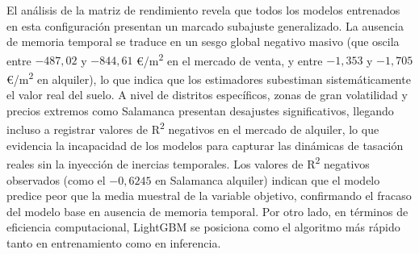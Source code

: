 \documentclass[a4paper,11pt,openany]{book}
\begin{document}
\begin{table}[H]
\centering
\caption{Matriz de rendimiento comparativa del Escenario Inicial (Modelo Base sin retardo temporal) - Mercado de Alquiler (€/m\textsuperscript{2})}
\label{tab:base_model_metrics_alquiler}
\end{table}

El análisis de la matriz de rendimiento revela que todos los modelos entrenados en esta configuración presentan un marcado subajuste generalizado. La ausencia de memoria temporal se traduce en un sesgo global negativo masivo (que oscila entre $-487,02$ y $-844,61$ €/m\textsuperscript{2} en el mercado de venta, y entre $-1,353$ y $-1,705$ €/m\textsuperscript{2} en alquiler), lo que indica que los estimadores subestiman sistemáticamente el valor real del suelo. A nivel de distritos específicos, zonas de gran volatilidad y precios extremos como Salamanca presentan desajustes significativos, llegando incluso a registrar valores de R\textsuperscript{2} negativos en el mercado de alquiler, lo que evidencia la incapacidad de los modelos para capturar las dinámicas de tasación reales sin la inyección de inercias temporales. Los valores de R\textsuperscript{2} negativos observados (como el $-0{,}6245$ en Salamanca alquiler) indican que el modelo predice peor que la media muestral de la variable objetivo, confirmando el fracaso del modelo base en ausencia de memoria temporal. Por otro lado, en términos de eficiencia computacional, LightGBM se posiciona como el algoritmo más rápido tanto en entrenamiento como en inferencia.
\end{document}
